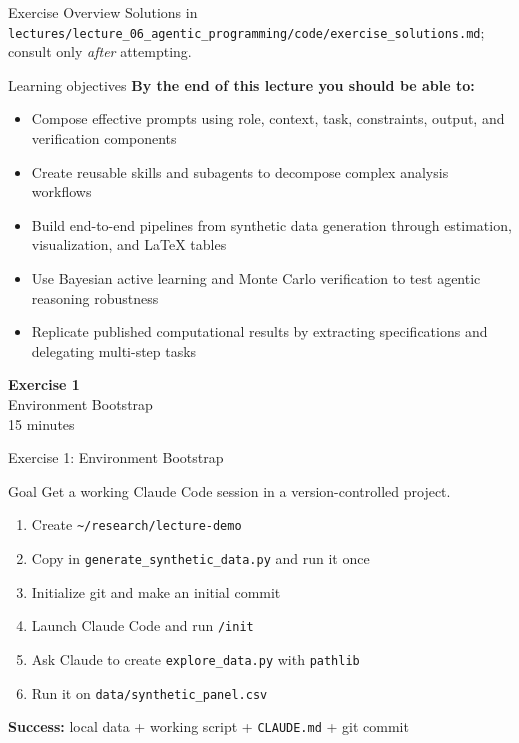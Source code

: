 \documentclass[aspectratio=169,10pt]{beamer}
\begin{document}
\begin{frame}{Exercise Overview}
\vspace{0.2em}
{\tiny Solutions in \texttt{lectures/lecture\_06\_agentic\_programming/code/exercise\_solutions.md}; consult only \emph{after} attempting.}
\end{frame}

\begin{frame}{Learning objectives}
\textbf{By the end of this lecture you should be able to:}
\begin{itemize}
  \item Compose effective prompts using role, context, task, constraints, output, and verification components
  \item Create reusable skills and subagents to decompose complex analysis workflows
  \item Build end-to-end pipelines from synthetic data generation through estimation, visualization, and LaTeX tables
  \item Use Bayesian active learning and Monte Carlo verification to test agentic reasoning robustness
  \item Replicate published computational results by extracting specifications and delegating multi-step tasks
\end{itemize}
\end{frame}


\begin{frame}{}
\vfill\begin{center}{\Huge \textcolor{uzhblue}{\textbf{Exercise 1}}}\\[12pt]
{\LARGE Environment Bootstrap}\\[6pt]{\small 15 minutes}\end{center}\vfill
\end{frame}

\begin{frame}[fragile]{Exercise 1: Environment Bootstrap}
\begin{exampleblock}{Goal}
Get a working Claude Code session in a version-controlled project.
\end{exampleblock}
\small
\begin{enumerate}\itemsep1pt
    \item Create \texttt{\~{}/research/lecture-demo}
    \item Copy in \texttt{generate\_synthetic\_data.py} and run it once
    \item Initialize git and make an initial commit
    \item Launch Claude Code and run \texttt{/init}
    \item Ask Claude to create \texttt{explore\_data.py} with \texttt{pathlib}
    \item Run it on \texttt{data/synthetic\_panel.csv}
\end{enumerate}

\textbf{Success:} local data + working script + \texttt{CLAUDE.md} + git commit
\end{frame}
\end{document}
